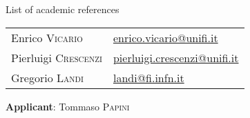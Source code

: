 \documentclass{article}
\begin{document}
    \begin{center}
        {\Huge List of academic references}\\[4cm]
    \end{center}
    
    \begin{tabular}{l l}
        Enrico \textsc{Vicario} & \href{mailto:enrico.vicario@unifi.it}{enrico.vicario@unifi.it}\\[0.5cm]
        Pierluigi \textsc{Crescenzi} & \href{mailto:pierluigi.crescenzi@unifi.it}{pierluigi.crescenzi@unifi.it}\\[0.5cm]
        Gregorio \textsc{Landi} & \href{mailto:landi@fi.infn.it}{landi@fi.infn.it}
    \end{tabular}
    
    \vfill
    \textbf{Applicant}: Tommaso \textsc{Papini}
\end{document}
